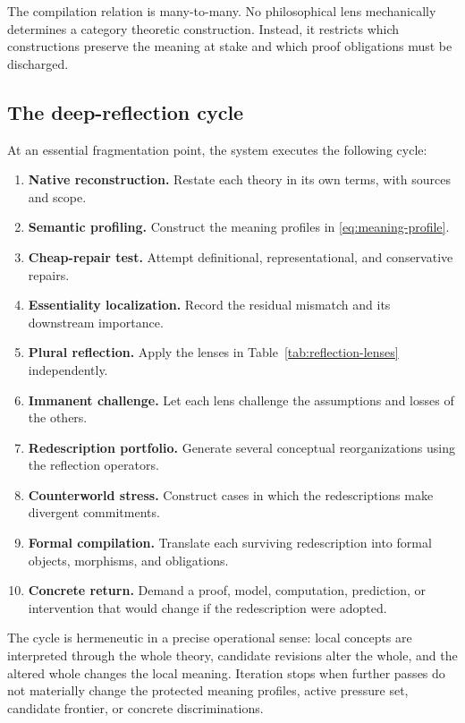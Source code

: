 \documentclass[11pt]{article}
\begin{document}
The compilation relation is many-to-many. No philosophical lens mechanically determines a category
theoretic construction. Instead, it restricts which constructions preserve the meaning at stake and
which proof obligations must be discharged.

\subsection{The deep-reflection cycle}

At an essential fragmentation point, the system executes the following cycle:
\begin{enumerate}
  \item \textbf{Native reconstruction.} Restate each theory in its own terms, with sources and scope.
  \item \textbf{Semantic profiling.} Construct the meaning profiles in
  \eqref{eq:meaning-profile}.
  \item \textbf{Cheap-repair test.} Attempt definitional, representational, and conservative repairs.
  \item \textbf{Essentiality localization.} Record the residual mismatch and its downstream importance.
  \item \textbf{Plural reflection.} Apply the lenses in Table~\ref{tab:reflection-lenses} independently.
  \item \textbf{Immanent challenge.} Let each lens challenge the assumptions and losses of the others.
  \item \textbf{Redescription portfolio.} Generate several conceptual reorganizations using the
  reflection operators.
  \item \textbf{Counterworld stress.} Construct cases in which the redescriptions make divergent
  commitments.
  \item \textbf{Formal compilation.} Translate each surviving redescription into formal objects,
  morphisms, and obligations.
  \item \textbf{Concrete return.} Demand a proof, model, computation, prediction, or intervention that
  would change if the redescription were adopted.
\end{enumerate}

The cycle is hermeneutic in a precise operational sense: local concepts are interpreted through the
whole theory, candidate revisions alter the whole, and the altered whole changes the local meaning.
Iteration stops when further passes do not materially change the protected meaning profiles, active
pressure set, candidate frontier, or concrete discriminations.
\end{document}

